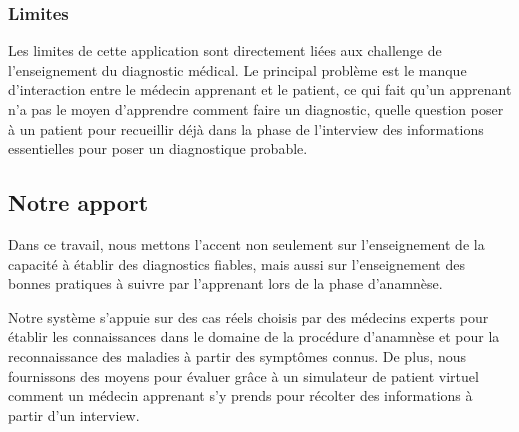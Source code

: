 \subsubsection{Limites}
Les limites de cette application sont directement liées aux challenge de l'enseignement du diagnostic médical. Le principal problème est le manque d'interaction entre le médecin apprenant et le patient, ce qui fait qu'un apprenant n'a pas le moyen d'apprendre comment faire un diagnostic, quelle question poser à un patient pour recueillir déjà dans la phase de l'interview des informations essentielles pour poser un diagnostique probable.

\subsection{Notre apport}
Dans ce travail, nous mettons l'accent non seulement sur l'enseignement de la capacité à établir des diagnostics fiables, mais aussi sur l'enseignement des bonnes pratiques à suivre par l'apprenant lors de la phase d'anamnèse.

Notre système s'appuie sur des cas réels choisis par des médecins experts pour établir les connaissances dans le domaine de la procédure d'anamnèse et pour la reconnaissance des maladies à partir des symptômes connus. De plus, nous fournissons des moyens pour évaluer grâce à un simulateur de patient virtuel comment un médecin apprenant s'y prends pour récolter des informations à partir d'un interview.




